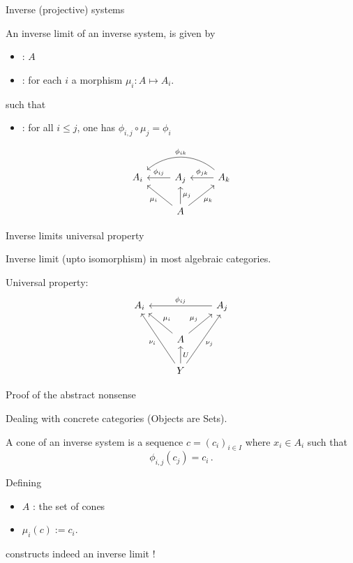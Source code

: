 \documentclass[compress,11pt]{beamer}
\renewcommand{\emph}[1]{{\color{red} #1}}
\begin{document}
\begin{frame}[fragile]{Inverse (projective) systems}

  \begin{DEFN}
    An \emph{inverse limit} of an inverse system, is given by
    \begin{itemize}
    \item {}: $A$
    \item {}: for each $i$ a morphism
      $\mu_{i}: A\mapsto A_i$.
    \end{itemize}
      such that
    \begin{itemize}
    \item {}: for all $i \leq j$, one has
      $\phi_{i,j} \circ \mu_{j} = \phi_{i}$
    \end{itemize}
  \end{DEFN}
\[
\begin{tikzcd}%
  A_{i}
  & A_{j} \arrow[l,"\phi_{ij}",swap]
  & A_{k} \arrow[l,"\phi_{jk}",swap] \arrow[ll,"\phi_{ik}",bend
  right=40,swap]\\
  & A \arrow[ul,"\mu_{i}"] \arrow[u,"\mu_{j}",swap]
  \arrow[ur,"\mu_{k}",swap]
\end{tikzcd}
\]

\end{frame}

\begin{frame}[fragile]{Inverse limits universal property}

  \begin{THEO}
    Inverse limit  (upto isomorphism) in most
    algebraic categories.
  \bigskip

  Universal property:
\[
\begin{tikzcd}
  A_{i}& & A_{j} \arrow[ll,"\phi_{ij}",swap] \\
  & A \arrow[ul,"\mu_{i}",swap] \arrow[ur,"\mu_{j}"]\\
  & Y \arrow[u,"U",swap]
  \arrow[uul,"\nu_{i}",end anchor={[xshift=0.2em]south}]
  \arrow[uur,"\nu_{j}",end anchor={[xshift=-0.2em]south},swap]
\end{tikzcd}
\]
  \end{THEO}
\end{frame}


\begin{frame}{Proof of the abstract nonsense}

  Dealing with concrete categories (Objects are Sets).
  \bigskip

  \begin{DEFN}
    A \emph{cone} of an inverse system is a sequence $c=(c_i)_{i\in I}$ where
    $x_i\in A_i$ such that \[\phi_{i,j}(c_j) = c_i\,.\]
  \end{DEFN}
  Defining
  \begin{itemize}
  \item $A$ : the set of cones
  \item $\mu_i(c) := c_i$.
  \end{itemize}
  constructs indeed an inverse limit !
\end{frame}
\end{document}
